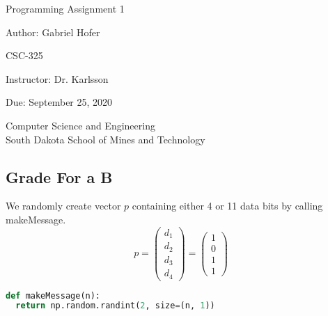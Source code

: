 \documentclass[12pt]{article}
\begin{document}
\begin{titlepage}
   \begin{center}
       \vspace*{1cm}
       \Large
       Programming Assignment 1
       \normalsize

       \vspace{0.5cm}

       Author: Gabriel Hofer

       \vspace{0.5cm}

       CSC-325

       \vspace{0.5cm}

       Instructor: Dr. Karlsson

       \vspace{0.5cm}

       Due: September 25, 2020

       \vfill

       Computer Science and Engineering\\
       South Dakota School of Mines and Technology\\
   \end{center}
\end{titlepage}

\newpage
\subsection*{Grade For a B}
\noindent We randomly create vector $p$ containing either 4 or 11 data bits by calling makeMessage.
\[
  p = 
  \begin{pmatrix}
    d_1 \\
    d_2 \\
    d_3 \\
    d_4
  \end{pmatrix}
  =
  \begin{pmatrix}
    1 \\
    0 \\
    1 \\
    1
  \end{pmatrix}
\]
\begin{lstlisting}[frame=single,language=Python,caption=makeMessage \label{code:makeMessage}]
def makeMessage(n): 
  return np.random.randint(2, size=(n, 1))
\end{lstlisting}
\end{document}
